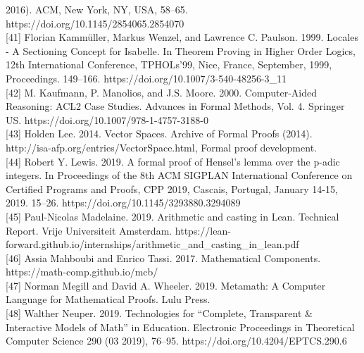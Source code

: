 \documentclass[
]{article}
\begin{document}
2016). ACM, New York, NY, USA, 58--65.
https://doi.org/10.1145/2854065.2854070\\
{[}41{]} Florian Kammüller, Markus Wenzel, and Lawrence C. Paulson.
1999. Locales - A Sectioning Concept for Isabelle. In Theorem Proving in
Higher Order Logics, 12th International Conference, TPHOLs'99, Nice,
France, September, 1999, Proceedings. 149--166.
https://doi.org/10.1007/3-540-48256-3\_11\\
{[}42{]} M. Kaufmann, P. Manolios, and J.S. Moore. 2000. Computer-Aided
Reasoning: ACL2 Case Studies. Advances in Formal Methods, Vol. 4.
Springer US. https://doi.org/10.1007/978-1-4757-3188-0\\
{[}43{]} Holden Lee. 2014. Vector Spaces. Archive of Formal Proofs
(2014). http://isa-afp.org/entries/VectorSpace.html, Formal proof
development.\\
{[}44{]} Robert Y. Lewis. 2019. A formal proof of Hensel's lemma over
the p-adic integers. In Proceedings of the 8th ACM SIGPLAN International
Conference on Certified Programs and Proofs, CPP 2019, Cascais,
Portugal, January 14-15, 2019. 15--26.
https://doi.org/10.1145/3293880.3294089\\
{[}45{]} Paul-Nicolas Madelaine. 2019. Arithmetic and casting in Lean.
Technical Report. Vrije Universiteit Amsterdam.
https://lean-forward.github.io/internships/arithmetic\_and\_casting\_in\_lean.pdf\\
{[}46{]} Assia Mahboubi and Enrico Tassi. 2017. Mathematical Components.
https://math-comp.github.io/mcb/\\
{[}47{]} Norman Megill and David A. Wheeler. 2019. Metamath: A Computer
Language for Mathematical Proofs. Lulu Press.\\
{[}48{]} Walther Neuper. 2019. Technologies for ``Complete, Transparent
\& Interactive Models of Math'' in Education. Electronic Proceedings in
Theoretical Computer Science 290 (03 2019), 76--95.
https://doi.org/10.4204/EPTCS.290.6
\end{document}
